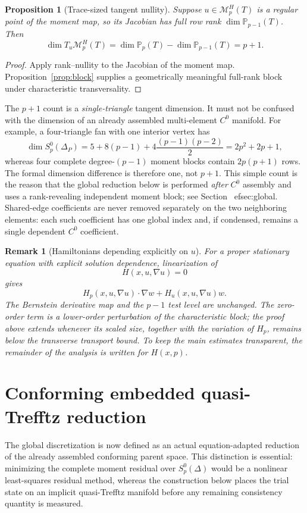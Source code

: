 \documentclass[preprint,12pt]{elsarticle}
\newtheorem{proposition}[theorem]{Proposition}
\newtheorem{remark}[theorem]{Remark}
\newcommand{\PP}{\mathbb P}
\newcommand{\grad}{\nabla}
\begin{document}
\begin{proposition}[Trace-sized tangent nullity]\label{prop:dim}
Suppose $u\in\mathcal M_p^H(T)$ is a regular point of the moment map, so its Jacobian has full row rank $\dim\PP_{p-1}(T)$.  Then
\begin{equation}\label{eq:dim}
 \dim T_u\mathcal M_p^H(T)=\dim\PP_p(T)-\dim\PP_{p-1}(T)=p+1.
\end{equation}
\end{proposition}
\begin{proof}
Apply rank--nullity to the Jacobian of the moment map.  Proposition~\ref{prop:block} supplies a geometrically meaningful full-rank block under characteristic transversality.
\end{proof}

The $p+1$ count is a \emph{single-triangle} tangent dimension.  It must not be confused with the dimension of an already assembled multi-element $C^0$ manifold.  For example, a four-triangle fan with one interior vertex has
\[
 \dim S_p^0(\Delta_P)=5+8(p-1)+4\frac{(p-1)(p-2)}2=2p^2+2p+1,
\]
whereas four complete degree-$(p-1)$ moment blocks contain $2p(p+1)$ rows.  The formal dimension difference is therefore one, not $p+1$.  This simple count is the reason that the global reduction below is performed \emph{after} $C^0$ assembly and uses a rank-revealing independent moment block; see Section~
ef{sec:global}.  Shared-edge coefficients are never removed separately on the two neighboring elements: each such coefficient has one global index and, if condensed, remains a single dependent $C^0$ coefficient.

\begin{remark}[Hamiltonians depending explicitly on $u$]\label{rem:udep}
For a proper stationary equation with explicit solution dependence, linearization of
\[
 H(x,u,\grad u)=0
\]
gives
\[
 H_p(x,u,\grad u)\cdot\grad w+H_u(x,u,\grad u)w.
\]
The Bernstein derivative map and the $p-1$ test level are unchanged.  The zero-order term is a lower-order perturbation of the characteristic block; the proof above extends whenever its scaled size, together with the variation of $H_p$, remains below the transverse transport bound.  To keep the main estimates transparent, the remainder of the analysis is written for $H(x,p)$.
\end{remark}

\section{Conforming embedded quasi-Trefftz reduction}\label{sec:global}
The global discretization is now defined as an actual equation-adapted reduction of the already assembled conforming parent space.  This distinction is essential: minimizing the complete moment residual over $S_p^0(\Delta)$ would be a nonlinear least-squares residual method, whereas the construction below places the trial state on an implicit quasi-Trefftz manifold before any remaining consistency quantity is measured.
\end{document}
